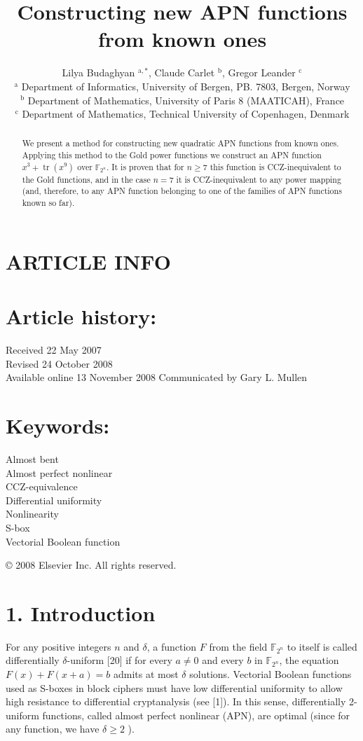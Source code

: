 \documentclass[10pt]{article}
\title{Constructing new APN functions from known ones }
\author{Lilya Budaghyan ${ }^{\mathrm{a}, *}$, Claude Carlet ${ }^{\mathrm{b}}$, Gregor Leander ${ }^{\mathrm{c}}$\\
${ }^{\mathrm{a}}$ Department of Informatics, University of Bergen, PB. 7803, Bergen, Norway\\
${ }^{\mathrm{b}}$ Department of Mathematics, University of Paris 8 (MAATICAH), France\\
${ }^{\mathrm{c}}$ Department of Mathematics, Technical University of Copenhagen, Denmark}
\date{}
\begin{document}
\maketitle


\section*{ARTICLE INFO}
\section*{Article history:}
Received 22 May 2007\\
Revised 24 October 2008\\
Available online 13 November 2008 Communicated by Gary L. Mullen

\section*{Keywords:}
Almost bent\\
Almost perfect nonlinear\\
CCZ-equivalence\\
Differential uniformity\\
Nonlinearity\\
S-box\\
Vectorial Boolean function

\begin{abstract}
We present a method for constructing new quadratic APN functions from known ones. Applying this method to the Gold power functions we construct an APN function $x^{3}+\operatorname{tr}\left(x^{9}\right)$ over $\mathbb{F}_{2^{n}}$. It is proven that for $n \geqslant 7$ this function is CCZ-inequivalent to the Gold functions, and in the case $n=7$ it is CCZ-inequivalent to any power mapping (and, therefore, to any APN function belonging to one of the families of APN functions known so far).
\end{abstract}

© 2008 Elsevier Inc. All rights reserved.

\section*{1. Introduction}
For any positive integers $n$ and $\delta$, a function $F$ from the field $\mathbb{F}_{2^{n}}$ to itself is called differentially $\delta$-uniform [20] if for every $a \neq 0$ and every $b$ in $\mathbb{F}_{2^{n}}$, the equation $F(x)+F(x+a)=b$ admits at most $\delta$ solutions. Vectorial Boolean functions used as S-boxes in block ciphers must have low differential uniformity to allow high resistance to differential cryptanalysis (see [1]). In this sense, differentially 2-uniform functions, called almost perfect nonlinear (APN), are optimal (since for any function, we have $\delta \geqslant 2$ ).
\end{document}
